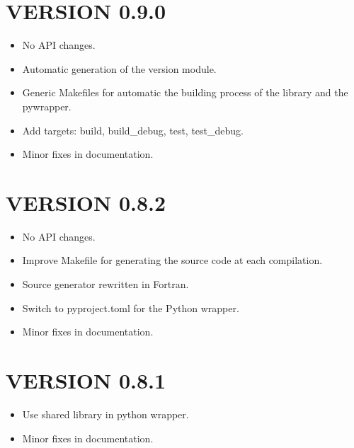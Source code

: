 \section*{VERSION 0.9.0}
\begin{itemize}
\item No API changes.
\item Automatic generation of the version module.
\item Generic Makefiles for automatic the building process of the library and the pywrapper.
\item Add targets: build, build\_debug, test, test\_debug.
\item Minor fixes in documentation.
\end{itemize}



\section*{VERSION 0.8.2}
\begin{itemize}
\item No API changes.
\item Improve Makefile for generating the source code at each compilation.
\item Source generator rewritten in Fortran.
\item Switch to pyproject.toml for the Python wrapper.
\item Minor fixes in documentation.
\end{itemize}



\section*{VERSION 0.8.1}
\begin{itemize}
\item Use shared library in python wrapper.
\item Minor fixes in documentation.
\end{itemize}



